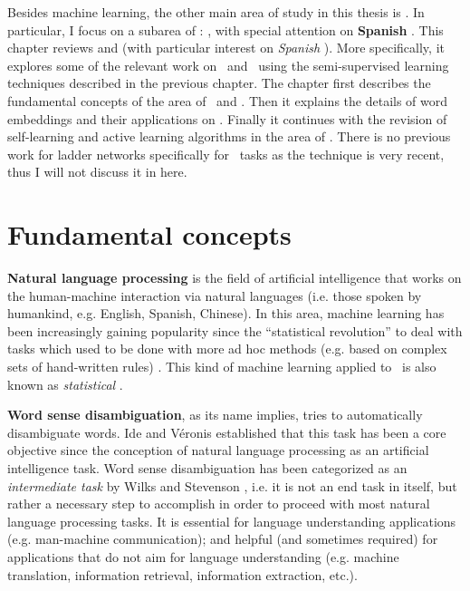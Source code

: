 Besides machine learning, the other main area of study in this thesis is {\bf
\nlp}. In particular, I focus on a subarea of \nlp: {\bf \wsd}, with special
attention on {\bf Spanish \vsd}. This chapter reviews {\em \nlp} and {\em \wsd}
(with particular interest on {\em Spanish \vsd}). More specifically, it
explores some of the relevant work on \nlp~and \wsd~using the semi-supervised
learning techniques described in the previous chapter. The chapter first
describes the fundamental concepts of the area of \nlp~and \wsd. Then it
explains the details of word embeddings and their applications on \nlp. Finally
it continues with the revision of self-learning and active learning algorithms
in the area of \nlp. There is no previous work for ladder networks specifically
for \nlp~tasks as the technique is very recent, thus I will not discuss it in
here.

\section{Fundamental concepts}\label{sec:domain_background:fundamental}

{\bf Natural language processing} is the field of artificial intelligence that
works on the human-machine interaction via natural languages (i.e. those spoken
by humankind, e.g. English, Spanish, Chinese). In this area, machine learning
has been increasingly gaining popularity since the ``statistical revolution''
to deal with tasks which used to be done with more ad hoc methods (e.g. based
on complex sets of hand-written rules) \cite{Johnson:2009:SRC:1642038.1642041}.
This kind of machine learning applied to \nlp~is also known as {\em statistical
\nlp}. 

{\bf Word sense disambiguation}, as its name implies, tries to automatically
disambiguate words. Ide and V\'eronis \cite{Ide1998a} established that this
task has been a core objective since the conception of natural language
processing as an artificial intelligence task. Word sense disambiguation has
been categorized as an {\em intermediate task} by Wilks and Stevenson
\cite{DBLP:journals/corr/cmp-lg-9607028}, i.e. it is not an end task in itself,
but rather a necessary step to accomplish in order to proceed with most natural
language processing tasks. It is essential for language understanding
applications (e.g. man-machine communication); and helpful (and sometimes
required) for applications that do not aim for language understanding (e.g.
machine translation, information retrieval, information extraction, etc.).

